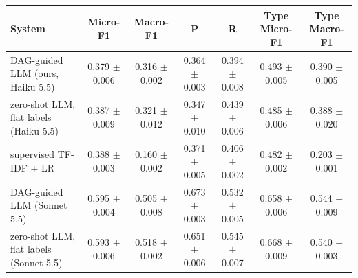 \begin{tabular}{lcccccc}
\toprule
System & Micro-F1 & Macro-F1 & P & R & Type Micro-F1 & Type Macro-F1 \\
\midrule
DAG-guided LLM (ours, Haiku 5.5) & 0.379 $\pm$ 0.006 & 0.316 $\pm$ 0.002 & 0.364 $\pm$ 0.003 & 0.394 $\pm$ 0.008 & 0.493 $\pm$ 0.005 & 0.390 $\pm$ 0.005 \\
zero-shot LLM, flat labels (Haiku 5.5) & 0.387 $\pm$ 0.009 & 0.321 $\pm$ 0.012 & 0.347 $\pm$ 0.010 & 0.439 $\pm$ 0.006 & 0.485 $\pm$ 0.006 & 0.388 $\pm$ 0.020 \\
supervised TF-IDF + LR & 0.388 $\pm$ 0.003 & 0.160 $\pm$ 0.002 & 0.371 $\pm$ 0.005 & 0.406 $\pm$ 0.002 & 0.482 $\pm$ 0.002 & 0.203 $\pm$ 0.001 \\
DAG-guided LLM (Sonnet 5.5) & 0.595 $\pm$ 0.004 & 0.505 $\pm$ 0.008 & 0.673 $\pm$ 0.003 & 0.532 $\pm$ 0.005 & 0.658 $\pm$ 0.006 & 0.544 $\pm$ 0.009 \\
zero-shot LLM, flat labels (Sonnet 5.5) & 0.593 $\pm$ 0.006 & 0.518 $\pm$ 0.002 & 0.651 $\pm$ 0.006 & 0.545 $\pm$ 0.007 & 0.668 $\pm$ 0.009 & 0.540 $\pm$ 0.003 \\
\bottomrule
\end{tabular}

